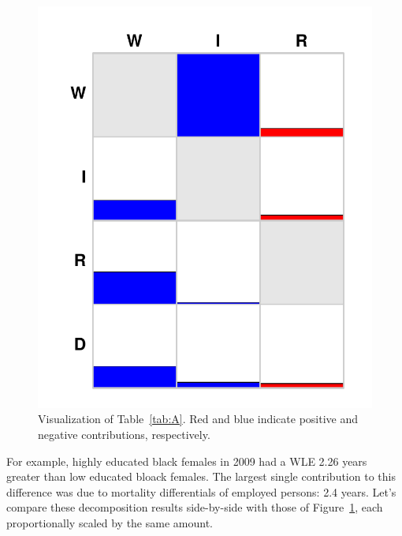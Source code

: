 \documentclass[12pt]{article}
\begin{document}
\begin{figure}[ht!]
\begin{center}
\caption{Visualization of Table~\ref{tab:A}. Red and blue indicate positive and
negative contributions, respectively. }
\label{fig:deca}
\includegraphics[scale=.5]{Figures/decA.pdf}
\end{center}
\end{figure}

For example, highly educated black females in 2009 had a WLE 2.26 years greater
than low educated bloack females. The largest single contribution to this
difference was due to mortality differentials of employed persons: 2.4 years.
Let's compare these decomposition results side-by-side with those of
Figure~\ref{fig:deca}, each proportionally scaled by the same amount.
\end{document}
